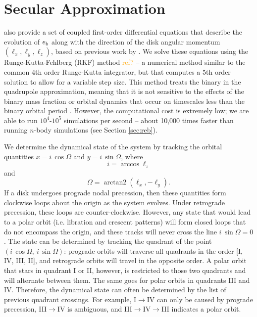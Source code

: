 \documentclass[twocolumn]{aastex631}
\newcommand{\TJ}[1]{\textcolor{orange}{#1}}
\DeclareMathOperator{\arctantwo}{arctan2}
\begin{document}
\section{Secular Approximation}
\label{sec:rk}
\citet[Equations (7-10)]{martin2019} also provide a set of coupled first-order differential equations that describe the evolution of $e_{\rm b}$ along with the direction of the disk angular momentum $(\ell_x, \ell_y, \ell_z)$, based on previous work by \citet{farago2010}. We solve these equations using the Runge-Kutta-Fehlberg (RKF) method \TJ{ref?} -- a numerical method similar to the common 4th order Runge-Kutta integrator, but that computes a 5th order solution to allow for a variable step size. This method treats the binary in the quadrupole approximation, meaning that it is not sensitive to the effects of the binary mass fraction or orbital dynamics that occur on timescales less than the binary orbital period \citep[e.g.][]{naoz2016}. However, the computational cost is extremely low; we are able to run $10^4$-$10^5$ simulations per second -- about 10,000 times faster than running $n$-body simulations (see Section \ref{sec:reb}).

We determine the dynamical state of the system by tracking the orbital quantities $x=i\,\cos{\Omega}$ and $y=i\,\sin{\Omega}$, where
\begin{equation}
    i = \arccos{\ell_z}
    \label{eq:inclination}
\end{equation}
and
\begin{equation}
    \Omega = \arctantwo (\ell_x, -\ell_y).
    \label{eq:omega}
\end{equation}
If a disk undergoes prograde nodal precession, then these quantities form clockwise loops about the origin as the system evolves. Under retrograde precession, these loops are counter-clockwise. However, any state that would lead to a polar orbit (i.e. libration and crescent patterns) will form closed loops that do not encompass the origin, and these tracks will never cross the line $i\,\sin{\Omega}=0$. The state can be determined by tracking the quadrant of the point $(i\,\cos{\Omega},~i\,\sin{\Omega})$: prograde orbits will traverse all quadrants in the order [I, IV, III, II], and retrograde orbits will travel in the opposite order. A polar orbit that stars in quadrant I or II, however, is restricted to those two quadrants and will alternate between them. The same goes for polar orbits in quadrants III and IV. Therefore, the dynamical state can often be determined by the list of previous quadrant crossings. For example, I$\rightarrow$IV can only be caused by prograde precession, III$\rightarrow$IV is ambiguous, and III$\rightarrow$IV$\rightarrow$III indicates a polar orbit.
\end{document}
